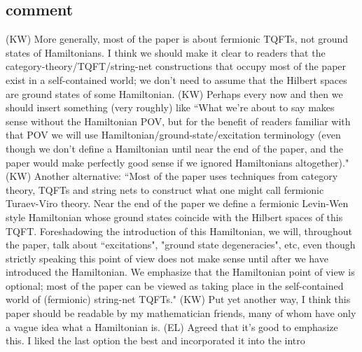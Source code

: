 \documentclass[12pt,a4paper]{article}
\newcommand{\kw}[1]{{\color{kwcolor}\footnotesize{(KW) #1}}}
\newcommand{\ethan}[1]{{\color{amethyst}\footnotesize{(EL) #1}}}
\begin{document}
\subsection{comment}
\kw{More generally, most of the paper is about fermionic TQFTs, not ground states of Hamiltonians.
I think we should make it clear to readers that the category-theory/TQFT/string-net constructions that occupy most of the paper
exist in a self-contained world; we don't need to assume that the Hilbert spaces are ground states of
some Hamiltonian.}
\kw{Perhaps every now and then we should insert something (very roughly) like
``What we're about to say makes sense without the Hamiltonian POV, but for the benefit of readers familiar with
that POV we will use Hamiltonian/ground-state/excitation terminology (even though we don't define a Hamiltonian until near the end of the paper,
and the paper would make perfectly good sense if we ignored Hamiltonians altogether)."}
\kw{Another alternative: ``Most of the paper uses techniques from category theory, TQFTs and string nets to construct what one
might call fermionic Turaev-Viro theory.
Near the end of the paper we define a fermionic Levin-Wen style Hamiltonian whose ground states coincide with 
the Hilbert spaces of this TQFT.
Foreshadowing the introduction of this Hamiltonian, we will, throughout the paper, talk about ``excitations", "ground state degeneracies", etc, even though
strictly speaking this point of view does not make sense until after we have introduced the Hamiltonian.
We emphasize that the Hamiltonian point of view is optional; most of the paper can be viewed as taking place
in the self-contained world of (fermionic) string-net TQFTs."}
\kw{Put yet another way, I think this paper should be readable by my mathematician friends, many of whom
have only a vague idea what a Hamiltonian is.}
\ethan{Agreed that it's good to emphasize this. I liked the last option the best and incorporated it into the intro}
 
 



 
\end{document}
